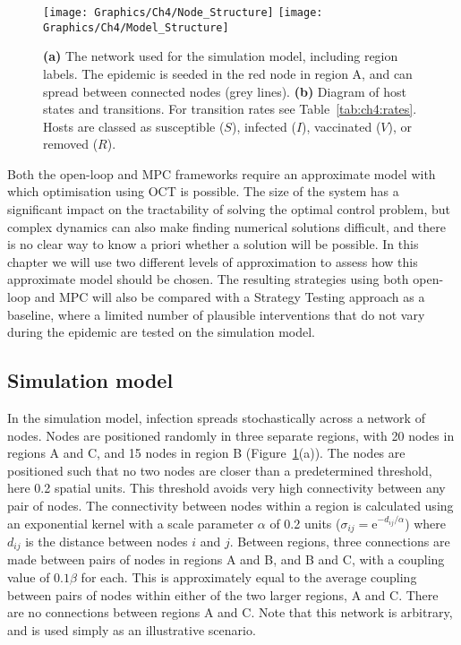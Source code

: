 \begin{figure}
    \centering
    \texttt{[image: Graphics/Ch4/Node\_Structure]}
    \texttt{[image: Graphics/Ch4/Model\_Structure]}
    \caption[Network epidemic model structure]{\textbf{(a)} The network used for the simulation model, including region labels. The epidemic is seeded in the red node in region A, and can spread between connected nodes (grey lines). \textbf{(b)} Diagram of host states and transitions. For transition rates see Table~\ref{tab:ch4:rates}. Hosts are classed as susceptible ($S$), infected ($I$), vaccinated ($V$), or removed ($R$).}
    \label{fig:ch4:node_structure_and_model}
\end{figure}

Both the open-loop and MPC frameworks require an approximate model with which optimisation using OCT is possible. The size of the system has a significant impact on the tractability of solving the optimal control problem, but complex dynamics can also make finding numerical solutions difficult, and there is no clear way to know a priori whether a solution will be possible. In this chapter we will use two different levels of approximation to assess how this approximate model should be chosen. The resulting strategies using both open-loop and MPC will also be compared with a Strategy Testing approach as a baseline, where a limited number of plausible interventions that do not vary during the epidemic are tested on the simulation model. 

\subsection{Simulation model}

In the simulation model, infection spreads stochastically across a network of nodes. Nodes are positioned randomly in three separate regions, with 20 nodes in regions A and C, and 15 nodes in region B (Figure~\ref{fig:ch4:node_structure_and_model}(a)). The nodes are positioned such that no two nodes are closer than a predetermined threshold, here 0.2 spatial units. This threshold avoids very high connectivity between any pair of nodes. The connectivity between nodes within a region is calculated using an exponential kernel with a scale parameter $\alpha$ of 0.2 units ($\sigma_{ij} = \mathrm{e}^{-d_{ij}/\alpha}$) where $d_{ij}$ is the distance between nodes $i$ and $j$. Between regions, three connections are made between pairs of nodes in regions A and B, and B and C, with a coupling value of $0.1\beta$ for each. This is approximately equal to the average coupling between pairs of nodes within either of the two larger regions, A and C\@. There are no connections between regions A and C\@. Note that this network is arbitrary, and is used simply as an illustrative scenario.

